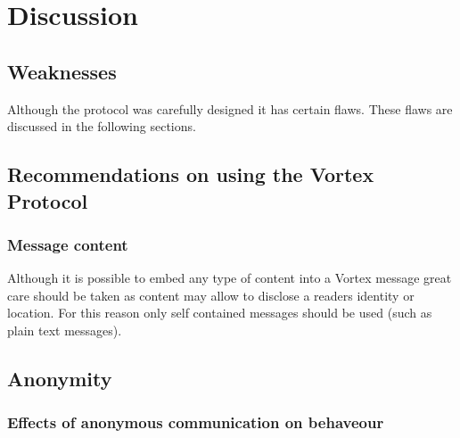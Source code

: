 
\part{Discussion}

\chapter{Weaknesses}
Although the protocol was carefully designed it has certain flaws. These flaws are discussed in the following sections.


\chapter{Recommendations on using the Vortex Protocol}

\section{Message content}
Although it is possible to embed any type of content into a Vortex message great care should be taken as content may allow to disclose a readers identity or location. For this reason only self contained messages should be used (such as plain text messages).



\chapter{Anonymity}

\section{Effects of anonymous communication on behaveour}



